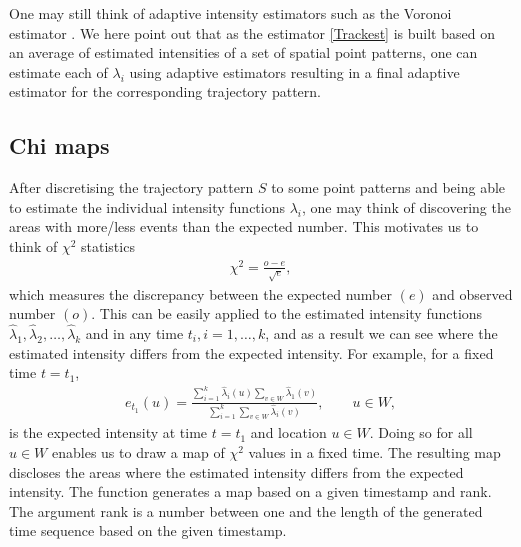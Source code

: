 \documentclass[article]{jss}
\begin{document}
One may still think of adaptive intensity estimators such as the Voronoi estimator \citep{Ord78,BSV10}. We here point out that as the estimator \eqref{Trackest} is built based on an average of estimated intensities of a set of spatial point patterns, one can estimate each of $\lambda_i$ using adaptive estimators resulting in a final adaptive estimator for the corresponding trajectory pattern.
  \subsection{Chi maps}
  After discretising the trajectory pattern $S$ to some point patterns and being able to estimate the individual intensity functions $\lambda_i$, one may think of discovering the areas with more/less events than the expected number. This motivates us to think of $\chi^2$ statistics 
  \begin{eqnarray}\label{chistat}
  \chi^2 =\frac{o-e}{\sqrt[]{e}},
  \end{eqnarray}
  which measures the discrepancy between the expected number $(e)$ and observed number $(o)$. This can be easily applied to the estimated intensity functions $\widehat{\lambda}_1,\widehat{\lambda}_2,\ldots,\widehat{\lambda}_k$ and in any time $t_i, i=1,\ldots,k$, and as a result we can see where the estimated intensity differs from the expected intensity. For example, for a fixed time $t=t_1$,
  \begin{eqnarray*}
  e_{t_1}(u)=\frac{\sum\limits_{i=1}^k \widehat{\lambda}_i(u) \sum\limits_{v \in W} \widehat{\lambda}_1(v)}{\sum\limits_{i=1}^{k}\sum\limits_{v \in W} \widehat{\lambda}_i (v)}, \qquad u \in W,
  \end{eqnarray*}
  is the expected intensity at time $t=t_1$ and location $u \in W$. Doing so for all $u \in W$ enables us to draw a map of $\chi^2$ values in a fixed time. The resulting map discloses the areas where the estimated intensity differs from the expected intensity. The function  generates a map based on a given timestamp and rank. The argument rank is a number between one and the length of the generated time sequence based on the given timestamp.
  
\end{document}

